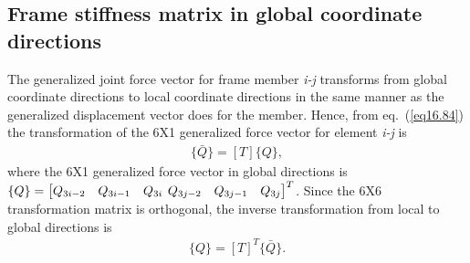 \documentclass{AeroStructure-ERJohnson}
\begin{document}
\subsection{Frame stiffness matrix in global coordinate directions}\label{sec16.3.2}

The generalized joint force vector for frame member \textit{i-j} transforms from global coordinate directions to local coordinate directions in the same manner as the generalized displacement vector does for the member. Hence, from eq.~(\ref{eq16.84}) the transformation of the 6X1 generalized force vector for element \textit{i-j} is
\begin{align}\label{eq16.86}
\{\bar{Q}\}=[T]\{Q\},
\end{align}
where the 6X1 generalized force vector in global directions is $\{Q\}=\left[\begin{array}{@{}lll@{}}Q_{3 i-2} & Q_{3 i-1} & Q_{3 i}\end{array}\right.\left.\begin{array}{@{}lll@{}}Q_{3 j-2} & Q_{3 j-1} & Q_{3 j}\end{array}\right]^{T}$. Since the 6X6 transformation matrix is orthogonal, the inverse transformation from local to global directions is
\begin{align}\label{eq16.87}
\{Q\}=[T]^{T}\{\bar{Q}\}.
\end{align}
\end{document}
